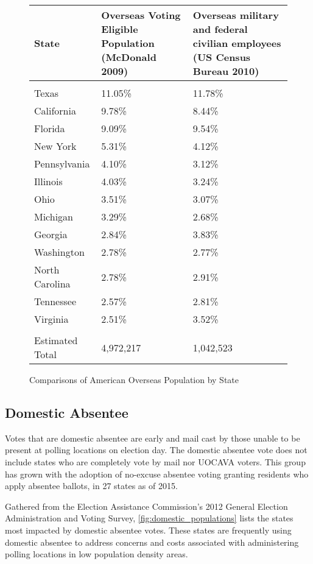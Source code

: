 \begin{figure}
\begin{center}
\begin{tabular}{l p{} p{}} %
{\bf State} & {\bf Overseas Voting Eligible \newline Population} \newline(McDonald 2009) & {\bf Overseas military and federal \newline civilian employees} \newline(US Census Bureau 2010)\\\hline\\
Texas & 11.05\% & 11.78\%\\
California & 9.78\% & 8.44\% \\
Florida & 9.09\% & 9.54\% \\
New York & 5.31\% & 4.12\% \\
Pennsylvania & 4.10\% & 3.12\% \\
Illinois & 4.03\% & 3.24\% \\
Ohio & 3.51\% & 3.07\% \\
Michigan & 3.29\% & 2.68\% \\
Georgia & 2.84\% & 3.83\% \\
Washington & 2.78\% & 2.77\% \\
North Carolina & 2.78\% & 2.91\% \\
Tennessee & 2.57\% & 2.81\% \\
Virginia & 2.51\% & 3.52\% \\\hline\\
Estimated Total & 4,972,217 & 1,042,523
\end{tabular}
\end{center}
\caption{Comparisons of American Overseas Population by State}
\label{fig:uocava_populations}
\end{figure}

\subsection{Domestic Absentee}
Votes that are domestic absentee are early and mail cast by those unable to be present at polling locations on election day. The domestic absentee vote does not include states who are completely vote by mail nor UOCAVA voters. This group has grown with the adoption of no-excuse absentee voting granting residents who apply absentee ballots, in 27 states as of 2015.

Gathered from the Election Assistance Commission's 2012 General Election Administration and Voting Survey, \autoref{fig:domestic_populations} lists the states most impacted by domestic absentee votes. These states are frequently using domestic absentee to address concerns and costs associated with administering polling locations in low population density areas.

